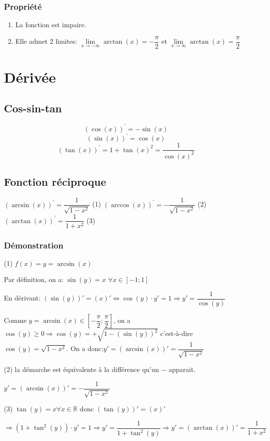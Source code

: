 \documentclass[12pt,a4paper]{report}
\begin{document}
	\subsubsection*{Propriété}
	\begin{enumerate}
		\item La fonction est impaire.
		\item Elle admet 2 limites: $\lim\limits_{x \rightarrow -\infty} \arctan(x)=-\dfrac{\pi}{2}$ et $\lim\limits_{x \rightarrow \infty} \arctan(x)=\dfrac{\pi}{2}$
	\end{enumerate}
	\section*{Dérivée}
	\subsection*{Cos-sin-tan}
	\[ (\cos(x))^{'}=-\sin(x)\] \[(\sin(x))^{'}=\cos(x)\] \[(\tan(x))^{'}=1+\tan(x)^2=\dfrac{1}{\cos(x)^2}  \]
	\subsection*{Fonction réciproque}
	$ (\arcsin(x))^{'}=\dfrac{1}{\sqrt{1-x^2}}$ (1) \hspace*{0.2cm} $(\arccos(x))^{'}=-\dfrac{1}{\sqrt{1-x^2}}$ (2) \hspace*{0.2cm} $(\arctan(x))^{'}=\dfrac{1}{1+x^2}$ (3)
	\subsubsection*{Démonstration}
	(1) $f(x)=y=\arcsin(x)$
	
	Par définition, on a: $\sin(y)=x$ \hspace{1cm} $ \forall x \in [-1;1]$
	
	En dérivant: $(\sin(y))'=(x)' \Leftrightarrow \cos(y)\cdot y'=1 \Rightarrow y'=\dfrac{1}{\cos(y)}$
	
	Comme $y=\arcsin(x) \in [-\dfrac{\pi}{2};\dfrac{\pi}{2}]$, on a $\cos(y) \geq 0 \Rightarrow \cos(y)=+\sqrt{1-(\sin(y))^2}$ c'est-à-dire $\cos(y)=\sqrt{1-x^2}$. On a donc:$y'=(\arcsin(x))'=\dfrac{1}{\displaystyle \sqrt{1-x^2}}$
	
	\vspace*{2cm}
	
	(2) la démarche est équivalente à la différence qu'un $-$ apparait. 
	
	$y'=(\arcsin(x))'=-\dfrac{1}{\sqrt{1-x^2}}$
	
	\vspace*{2cm}
	(3) $\tan(y)=x \forall x \in \mathbb{R}$ donc $(\tan(y))'=(x)'$
	
	$ \Rightarrow (1+\tan^{2}(y))\cdot y'=1 \Rightarrow y'=\dfrac{1}{1+\tan^{2}(y)} \Rightarrow y'=(\arctan(x))'=\dfrac{1}{1+x^2}$
	
\end{document}
